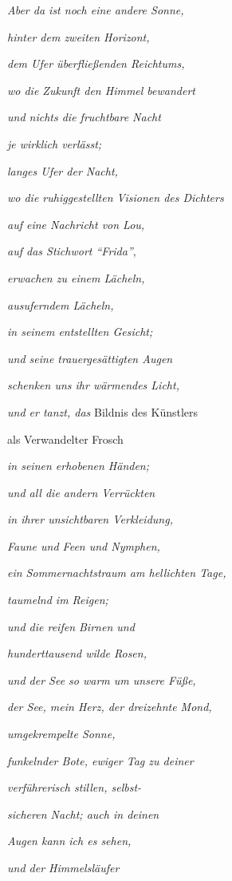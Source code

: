 \emph{
Aber da ist noch eine andere Sonne,}

\emph{
hinter dem zweiten Horizont,}

\emph{
dem Ufer überfließenden Reichtums, }

\emph{
wo die Zukunft den Himmel bewandert}

\emph{
und nichts die fruchtbare Nacht }

\emph{
je wirklich verlässt;}

\emph{
langes Ufer der Nacht, }

\emph{
wo die ruhiggestellten Visionen des Dichters }

\emph{
auf eine Nachricht von Lou, }

\emph{auf das Stichwort "`Frida"'},

\emph{
erwachen zu einem Lächeln,}

\emph{
ausuferndem Lächeln,}

\emph{
in seinem entstellten Gesicht;}

\emph{
und seine trauergesättigten Augen}

\emph{
schenken uns ihr wärmendes Licht, }

\emph{und er tanzt, das }Bildnis des Künstlers

als Verwandelter Frosch 

\emph{
in seinen erhobenen Händen;}

\emph{
und all die andern Verrückten}

\emph{
in ihrer unsichtbaren Verkleidung,}

\emph{
Faune und Feen und Nymphen,}

\emph{
ein Sommernachtstraum am hellichten Tage,}

\emph{
taumelnd im Reigen;}

\emph{
und die reifen Birnen und}

\emph{
hunderttausend wilde Rosen,}

\emph{
und der See so warm um unsere Füße,}

\emph{
der See, mein Herz, der dreizehnte Mond, }

\emph{
umgekrempelte Sonne,}

\emph{
funkelnder Bote, ewiger Tag zu deiner}

\emph{
verführerisch stillen, selbst-}

\emph{
sicheren Nacht; auch in deinen}

\emph{
Augen kann ich es sehen,}

\emph{
und der Himmelsläufer}

